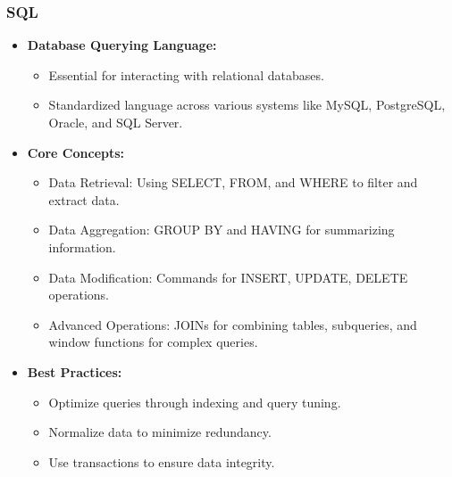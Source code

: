 \documentclass[10pt]{beamer}
\begin{document}
\begin{frame}
    \frametitle{SQL}
    \begin{itemize}
        \item \textbf{Database Querying Language:}
            \begin{itemize}
                \item Essential for interacting with relational databases.
                \item Standardized language across various systems like MySQL, PostgreSQL, Oracle, and SQL Server.
            \end{itemize}
        \item \textbf{Core Concepts:}
            \begin{itemize}
                \item Data Retrieval: Using SELECT, FROM, and WHERE to filter and extract data.
                \item Data Aggregation: GROUP BY and HAVING for summarizing information.
                \item Data Modification: Commands for INSERT, UPDATE, DELETE operations.
                \item Advanced Operations: JOINs for combining tables, subqueries, and window functions for complex queries.
            \end{itemize}
        \item \textbf{Best Practices:}
            \begin{itemize}
                \item Optimize queries through indexing and query tuning.
                \item Normalize data to minimize redundancy.
                \item Use transactions to ensure data integrity.
            \end{itemize}
    \end{itemize}
\end{frame}
\end{document}
